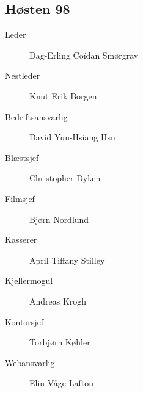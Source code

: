 {\begin{minipage}{0.6\textwidth}
\subsection*{Høsten 98}

\begin{description}
	\item[Leder] Dag-Erling Coïdan Smørgrav
	\item[Nestleder] Knut Erik Borgen
	\item[Bedriftsansvarlig] David Yun-Hsiang Hsu
	\item[Blæstsjef] Christopher Dyken
	\item[Filmsjef] Bjørn Nordlund
	\item[Kasserer] April Tiffany Stilley
	\item[Kjellermogul] Andreas Krogh
	\item[Kontorsjef] Torbjørn Køhler
	\item[Webansvarlig] Elin Våge Lafton
\end{description}
\end{minipage}
}


